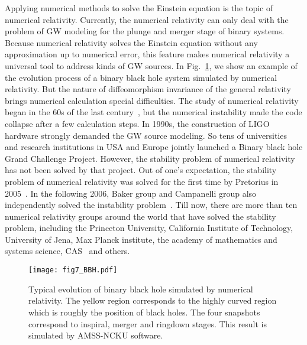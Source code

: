 \documentclass[a4paper,11pt]{article}
\begin{document}
Applying numerical methods to solve the Einstein equation is the topic of numerical relativity. Currently, the numerical relativity can only  deal with the problem of GW modeling for the plunge and merger stage of binary systems. Because numerical relativity solves the Einstein equation without any approximation up to numerical error, this feature makes numerical relativity a universal tool to address kinds of GW sources. In Fig.~\ref{fig:BBH}, we show an example of the evolution process of a binary black hole system simulated by numerical relativity. But the nature of diffeomorphism invariance of the general relativity brings numerical calculation special difficulties. The study of numerical relativity began in the 60s of the last century~\cite{HAHN1964304}, but the numerical instability made the code collapse after a few calculation steps. In 1990s, the construction of LIGO hardware strongly demanded the GW source modeling. So tens of universities and research institutions in USA and Europe jointly launched a Binary black hole Grand Challenge Project. However, the stability problem of numerical relativity has not been solved by that project. Out of one's expectation, the stability problem of numerical relativity was solved for the first time by Pretorius in 2005~\cite{Pretorius:2005gq}. In the following 2006, Baker group and Campanelli group also independently solved the instability problem~\cite{Campanelli:2005dd,Baker:2005vv}. Till now, there are more than ten numerical relativity groups around the world that have solved the stability problem, including the Princeton University, California Institute of Technology, University of Jena, Max Planck institute, the academy of mathematics and systems science, CAS~\cite{Cao:2008wn} and others.

\begin{figure}
  \centering
  \texttt{[image: fig7\_BBH.pdf]}
  \caption{Typical evolution of binary black hole simulated by numerical relativity. The yellow region corresponds to the highly curved region which is roughly the position of black holes. The four snapshots correspond to inspiral, merger and ringdown stages. This result is simulated by AMSS-NCKU software.}\label{fig:BBH}
\end{figure}
\end{document}
